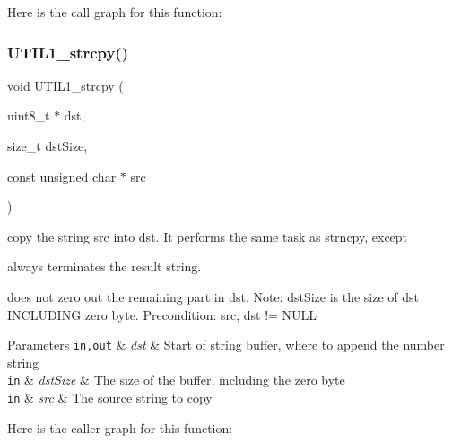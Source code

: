 Here is the call graph for this function\+:
\mbox{\label{group___u_t_i_l1__module_ga05eaa0c70134ec4c75b50e415470636b}} 
\subsubsection{\texorpdfstring{U\+T\+I\+L1\+\_\+strcpy()}{UTIL1\_strcpy()}}
{\footnotesize\ttfamily void U\+T\+I\+L1\+\_\+strcpy (\begin{DoxyParamCaption}\item[{uint8\+\_\+t $\ast$}]{dst,  }\item[{size\+\_\+t}]{dst\+Size,  }\item[{const unsigned char $\ast$}]{src }\end{DoxyParamCaption})}



copy the string src into dst. It performs the same task as strncpy, except 


\begin{DoxyItemize}
\item always terminates the result string.
\item does not zero out the remaining part in dst. Note\+: dst\+Size is the size of dst I\+N\+C\+L\+U\+D\+I\+NG zero byte. Precondition\+: src, dst != N\+U\+LL 
\begin{DoxyParams}[1]{Parameters}
\mbox{\tt in,out}  & {\em dst} & Start of string buffer, where to append the number string \\
\hline
\mbox{\tt in}  & {\em dst\+Size} & The size of the buffer, including the zero byte \\
\hline
\mbox{\tt in}  & {\em src} & The source string to copy \\
\hline
\end{DoxyParams}

\end{DoxyItemize}Here is the caller graph for this function\+:
\mbox{\label{group___u_t_i_l1__module_gab96a00a8f4c2a68a67eba36633efc839}} 
